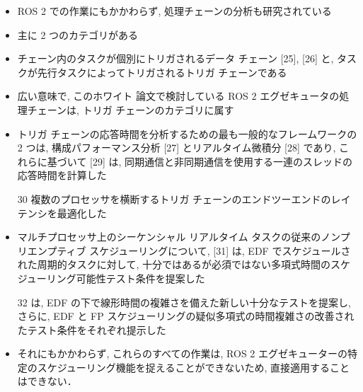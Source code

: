 \begin{frame}{}
    \begin{itemize}
        \item ROS 2 での作業にもかかわらず, 処理チェーンの分析も研究されている
\item 主に 2 つのカテゴリがある
\item チェーン内のタスクが個別にトリガされるデータ チェーン [25], [26] と, タスクが先行タスクによってトリガされるトリガ チェーンである
\item 広い意味で, このホワイト 論文で検討している ROS 2 エグゼキュータの処理チェーンは, トリガ チェーンのカテゴリに属す
\item トリガ チェーンの応答時間を分析するための最も一般的なフレームワークの 2 つは, 構成パフォーマンス分析 [27] とリアルタイム微積分 [28] であり, これらに基づいて [29] は, 同期通信と非同期通信を使用する一連のスレッドの応答時間を計算した
\item [30] 複数のプロセッサを横断するトリガ チェーンのエンドツーエンドのレイテンシを最適化した
\item マルチプロセッサ上のシーケンシャル リアルタイム タスクの従来のノンプリエンプティブ スケジューリングについて, [31] は, EDF でスケジュールされた周期的タスクに対して, 十分ではあるが必須ではない多項式時間のスケジューリング可能性テスト条件を提案した
\item [32] は, EDF の下で線形時間の複雑さを備えた新しい十分なテストを提案し, さらに, EDF と FP スケジューリングの疑似多項式の時間複雑さの改善されたテスト条件をそれぞれ提示した
\item それにもかかわらず, これらのすべての作業は, ROS 2 エグゼキューターの特定のスケジューリング機能を捉えることができないため, 直接適用することはできない．
    \end{itemize}
\end{frame}
